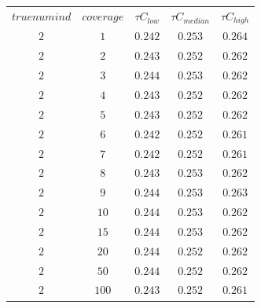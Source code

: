 \begin{table}[H]
\begin{tabular}{ccccc}
$truenumind$ & $coverage$ & ${\tau}C_{low}$ & ${\tau}C_{median}$ & ${\tau}C_{high}$\\
$2$ & $1$ & $0.242$ & $0.253$ & $0.264$\\
$2$ & $2$ & $0.243$ & $0.252$ & $0.262$\\
$2$ & $3$ & $0.244$ & $0.253$ & $0.262$\\
$2$ & $4$ & $0.243$ & $0.252$ & $0.262$\\
$2$ & $5$ & $0.243$ & $0.252$ & $0.262$\\
$2$ & $6$ & $0.242$ & $0.252$ & $0.261$\\
$2$ & $7$ & $0.242$ & $0.252$ & $0.261$\\
$2$ & $8$ & $0.243$ & $0.253$ & $0.262$\\
$2$ & $9$ & $0.244$ & $0.253$ & $0.263$\\
$2$ & $10$ & $0.244$ & $0.253$ & $0.262$\\
$2$ & $15$ & $0.244$ & $0.253$ & $0.262$\\
$2$ & $20$ & $0.244$ & $0.252$ & $0.262$\\
$2$ & $50$ & $0.244$ & $0.252$ & $0.262$\\
$2$ & $100$ & $0.243$ & $0.252$ & $0.261$\\
\end{tabular}
\end{table}
 
